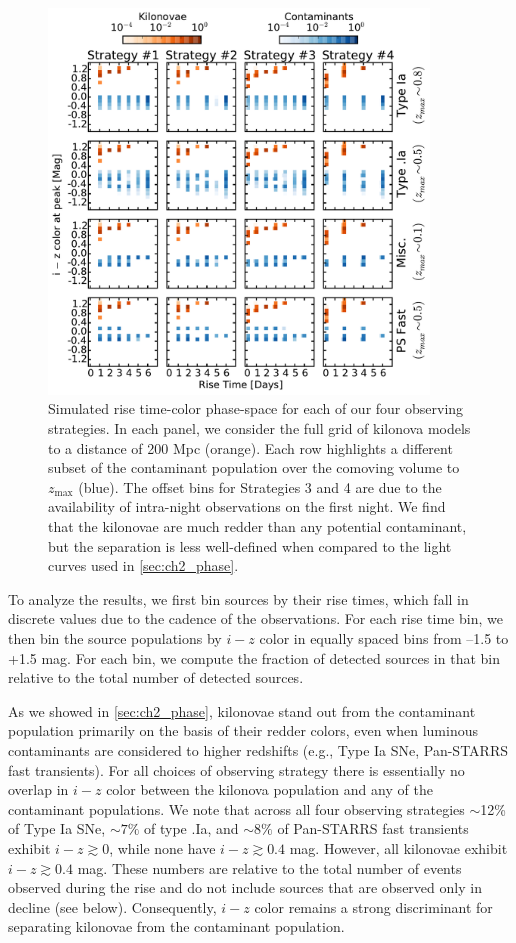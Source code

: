 \begin{figure}[t!]
\centering
\includegraphics[width=0.9\textwidth]{./figs/chapter2/ch2_f8.pdf}
\caption{Simulated rise time-color phase-space for each of our four observing strategies. In each panel, we consider the full grid of kilonova models to a distance of 200 Mpc (orange). Each row highlights a different subset of the contaminant population over the comoving volume to $z_{\text{max}}$ (blue). The offset bins for Strategies 3 and 4 are due to the availability of intra-night observations on the first night. We find that the kilonovae are much redder than any potential contaminant, but the separation is less well-defined when compared to the light curves used in \cref{sec:ch2_phase}.}
\label{fig:ch2_mcphasecol}
\end{figure}

To analyze the results, we first bin sources by their rise times, which fall in discrete values due to the cadence of the observations. For each rise time bin, we then bin the source populations by $i-z$ color in equally spaced bins from --1.5 to +1.5 mag. For each bin, we compute the fraction of detected sources in that bin relative to the total number of detected sources.

\clearpage
As we showed in \cref{sec:ch2_phase}, kilonovae stand out from the contaminant population primarily on the basis of their redder colors, even when luminous contaminants are considered to higher redshifts (e.g., Type Ia SNe, Pan-STARRS fast transients). For all choices of observing strategy there is essentially no overlap in $i-z$ color between the kilonova population and any of the contaminant populations. We note that across all four observing strategies $\sim$12\% of Type Ia SNe, $\sim7\%$ of type .Ia, and $\sim8\%$ of Pan-STARRS fast transients exhibit $i-z\gtrsim 0$, while none have $i-z\gtrsim0.4$ mag. However, all kilonovae exhibit $i-z\gtrsim0.4$ mag. These numbers are relative to the total number of events observed during the rise and do not include sources that are observed only in decline (see below). Consequently, $i-z$ color remains a strong discriminant for separating kilonovae from the contaminant population.

